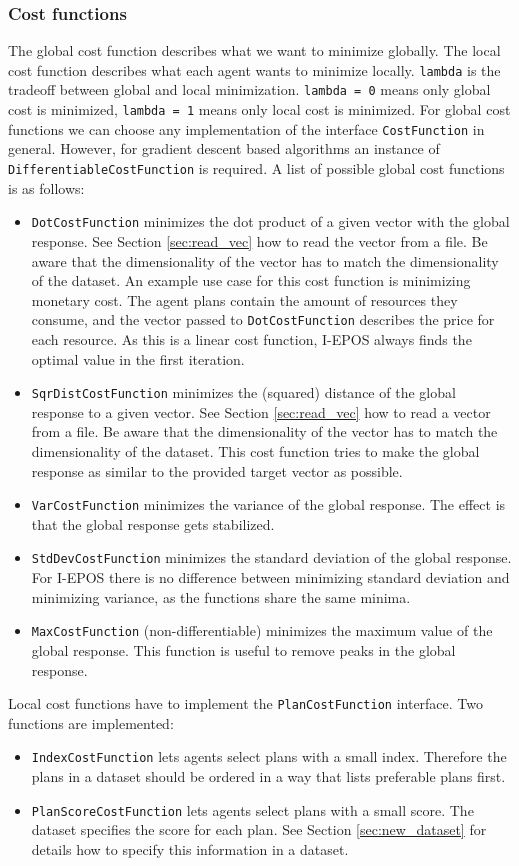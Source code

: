 \documentclass[11pt]{article} %
\newcommand{\code}{\texttt}
\begin{document}
\subsubsection*{Cost functions}
The global cost function describes what we want to minimize globally. The local cost function describes what each agent wants to minimize locally. \code{lambda} is the tradeoff between global and local minimization. \code{lambda = 0} means only global cost is minimized, \code{lambda = 1} means only local cost is minimized.
For global cost functions we can choose any implementation of the interface \code{CostFunction} in general. However, for gradient descent based algorithms an instance of \code{DifferentiableCostFunction} is required. A list of possible global cost functions is as follows:
\begin{itemize}
	\item \code{DotCostFunction} minimizes the dot product of a given vector with the global response. See Section \ref{sec:read_vec} how to read the vector from a file. Be aware that the dimensionality of the vector has to match the dimensionality of the dataset.
An example use case for this cost function is minimizing monetary cost. The agent plans contain the amount of resources they consume, and the vector passed to \code{DotCostFunction} describes the price for each resource.
As this is a linear cost function, I-EPOS always finds the optimal value in the first iteration.
	\item \code{SqrDistCostFunction} minimizes the (squared) distance of the global response to a given vector. See Section \ref{sec:read_vec} how to read a vector from a file. Be aware that the dimensionality of the vector has to match the dimensionality of the dataset.
This cost function tries to make the global response as similar to the provided target vector as possible.
	\item \code{VarCostFunction} minimizes the variance of the global response. The effect is that the global response gets stabilized.
	\item \code{StdDevCostFunction} minimizes the standard deviation of the global response. For I-EPOS there is no difference between minimizing standard deviation and minimizing variance, as the functions share the same minima.
	\item \code{MaxCostFunction} (non-differentiable) minimizes the maximum value of the global response. This function is useful to remove peaks in the global response.
\end{itemize}
Local cost functions have to implement the \code{PlanCostFunction} interface. Two functions are implemented:
\begin{itemize}
	\item \code{IndexCostFunction} lets agents select plans with a small index. Therefore the plans in a dataset should be ordered in a way that lists preferable plans first.
	\item \code{PlanScoreCostFunction} lets agents select plans with a small score. The dataset specifies the score for each plan. See Section \ref{sec:new_dataset} for details how to specify this information in a dataset.
\end{itemize}
\end{document}
